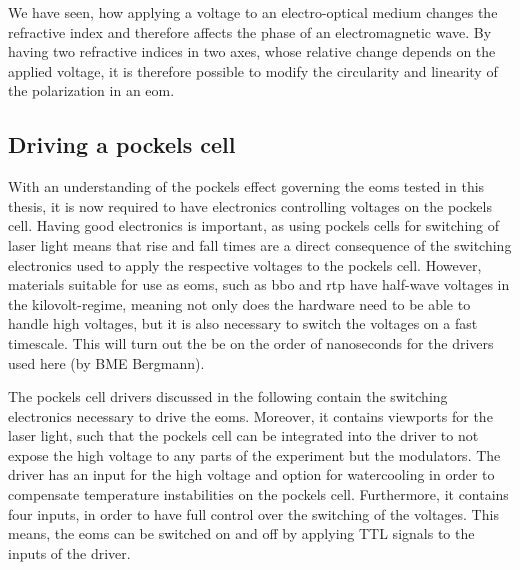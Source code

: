 We have seen, how applying a voltage to an electro-optical medium changes the refractive index and therefore affects the phase of an electromagnetic wave. By having two refractive indices in two axes, whose relative change depends on the applied voltage, it is therefore possible to modify the circularity and linearity of the polarization in an \acl{eom}.

\subsection{Driving a pockels cell}

With an understanding of the pockels effect governing the \acp{eom} tested in this thesis, it is now required to have electronics controlling voltages on the pockels cell. Having good electronics is important, as using pockels cells for switching of laser light means that rise and fall times are a direct consequence of the switching electronics used to apply the respective voltages to the pockels cell. However, materials suitable for use as \acp{eom}, such as \ac{bbo} and \ac{rtp} have half-wave voltages in the kilovolt-regime, meaning not only does the hardware need to be able to handle high voltages, but it is also necessary to switch the voltages on a fast timescale. This will turn out the be on the order of nanoseconds for the drivers used here (by BME Bergmann).


The pockels cell drivers discussed in the following contain the switching electronics necessary to drive the \acp{eom}. Moreover, it contains viewports for the laser light, such that the pockels cell can be integrated into the driver to not expose the high voltage to any parts of the experiment but the modulators. The driver has an input for the high voltage and option for watercooling in order to compensate temperature instabilities on the pockels cell. Furthermore, it contains four inputs, in order to have full control over the switching of the voltages. This means, the \acp{eom} can be switched on and off by applying TTL signals to the inputs of the driver.

